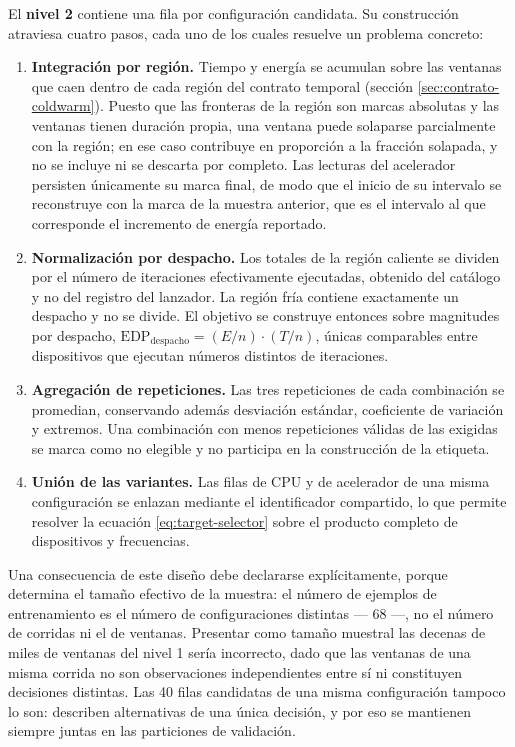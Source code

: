 \documentclass[12pt,oneside,spanish]{book}
\begin{document}
El \textbf{nivel 2} contiene una fila por configuración candidata. Su construcción atraviesa cuatro pasos, cada uno de los cuales resuelve un problema concreto:

\begin{enumerate}
    \item \textbf{Integración por región.} Tiempo y energía se acumulan sobre las ventanas que caen dentro de cada región del contrato temporal (sección \ref{sec:contrato-coldwarm}). Puesto que las fronteras de la región son marcas absolutas y las ventanas tienen duración propia, una ventana puede solaparse parcialmente con la región; en ese caso contribuye en proporción a la fracción solapada, y no se incluye ni se descarta por completo. Las lecturas del acelerador persisten únicamente su marca final, de modo que el inicio de su intervalo se reconstruye con la marca de la muestra anterior, que es el intervalo al que corresponde el incremento de energía reportado.
    \item \textbf{Normalización por despacho.} Los totales de la región caliente se dividen por el número de iteraciones efectivamente ejecutadas, obtenido del catálogo y no del registro del lanzador. La región fría contiene exactamente un despacho y no se divide. El objetivo se construye entonces sobre magnitudes por despacho, $\mathrm{EDP}_{\text{despacho}} = (E/n)\cdot(T/n)$, únicas comparables entre dispositivos que ejecutan números distintos de iteraciones.
    \item \textbf{Agregación de repeticiones.} Las tres repeticiones de cada combinación se promedian, conservando además desviación estándar, coeficiente de variación y extremos. Una combinación con menos repeticiones válidas de las exigidas se marca como no elegible y no participa en la construcción de la etiqueta.
    \item \textbf{Unión de las variantes.} Las filas de CPU y de acelerador de una misma configuración se enlazan mediante el identificador compartido, lo que permite resolver la ecuación \eqref{eq:target-selector} sobre el producto completo de dispositivos y frecuencias.
\end{enumerate}

Una consecuencia de este diseño debe declararse explícitamente, porque determina el tamaño efectivo de la muestra: el número de ejemplos de entrenamiento es el número de configuraciones distintas --- 68 ---, no el número de corridas ni el de ventanas. Presentar como tamaño muestral las decenas de miles de ventanas del nivel 1 sería incorrecto, dado que las ventanas de una misma corrida no son observaciones independientes entre sí ni constituyen decisiones distintas. Las 40 filas candidatas de una misma configuración tampoco lo son: describen alternativas de una única decisión, y por eso se mantienen siempre juntas en las particiones de validación.
\end{document}
